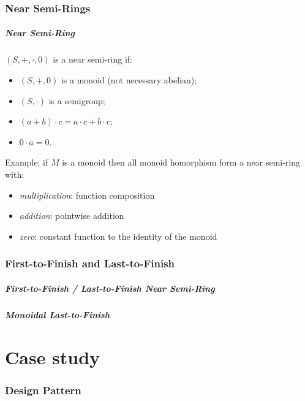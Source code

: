 \documentclass[t,dvipsnames,hyperref={colorlinks,citecolor=NavyBlue,linkcolor=NavyBlue,anchorcolor=NavyBlue,urlcolor=NavyBlue}]{beamer}
\begin{document}
\section{Near Semi-Rings}
\begin{frame}
  \frametitle{Near Semi-Ring}
  \begin{definition}
    \((S, +, \cdot, 0)\) is a near semi-ring if:
    \begin{itemize}
      \item \((S, +, 0)\) is a monoid (not necessary abelian);
      \item \((S, \cdot)\) is a semigroup;
      \item \((a + b) \cdot c = a \cdot c + b \cdot c\);
      \item \(0 \cdot a = 0\).
    \end{itemize}
  \end{definition}
  Example: if \(M\) is a monoid then all monoid homorphism form a near semi-ring with:
  \begin{itemize}
    \item \textit{multiplication}: function composition
    \item \textit{addition}: pointwise addition
    \item \textit{zero}: constant function to the identity of the monoid
  \end{itemize}
\end{frame}

\section{First-to-Finish and Last-to-Finish}

\begin{frame}
  \frametitle{First-to-Finish / Last-to-Finish Near Semi-Ring}
\end{frame}

\begin{frame}
  \frametitle{Monoidal Last-to-Finish}
\end{frame}

\part{Case study}
\frame{
  \partpage
  \tableofcontents[part=2]
}

\section{Design Pattern}
\end{document}
